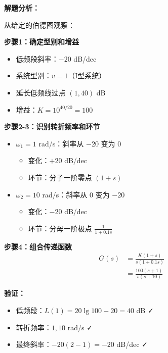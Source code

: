 \begin{minipage}[t]{0.48\textwidth}
\textbf{解题分析：}

从给定的伯德图观察：

\textbf{步骤1：确定型别和增益}
\begin{itemize}
    \item 低频段斜率：$-20$ dB/dec
    \item 系统型别：$v = 1$（I型系统）
    \item 延长低频线过点 $(1, 40)$ dB
    \item 增益：$K = 10^{40/20} = 100$
\end{itemize}

\textbf{步骤2-3：识别转折频率和环节}
\begin{itemize}
    \item $\omega_1 = 1$ rad/s：斜率从 $-20$ 变为 $0$
    \begin{itemize}
        \item 变化：$+20$ dB/dec
        \item 环节：分子一阶零点 $(1+s)$
    \end{itemize}
    \item $\omega_2 = 10$ rad/s：斜率从 $0$ 变为 $-20$
    \begin{itemize}
        \item 变化：$-20$ dB/dec
        \item 环节：分母一阶极点 $\frac{1}{1+0.1s}$
    \end{itemize}
\end{itemize}

\textbf{步骤4：组合传递函数}
\begin{align*}
G(s) &= \frac{K(1+s)}{s(1+0.1s)} \\
&= \frac{100(s+1)}{s(s+10)}
\end{align*}

\textbf{验证：}
\begin{itemize}
    \item 低频段：$L(1) = 20\lg 100 - 20 = 40$ dB ✓
    \item 转折频率：$1, 10$ rad/s ✓
    \item 最终斜率：$-20(2-1) = -20$ dB/dec ✓
\end{itemize}
\end{minipage}\hfill
